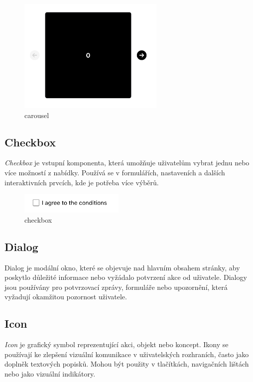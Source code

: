 \begin{figure}[H]
  \centering
  \includegraphics[width=7cm]{images/carousel}
  \captionsetup{justification=centering,margin=2cm}
  \caption{carousel} \label{picture:carousel}
\end{figure}

\subsection{Checkbox}
\emph{Checkbox} je vstupní komponenta, která umožňuje uživatelům vybrat jednu nebo více možností z nabídky. Používá se v formulářích, nastaveních a dalších interaktivních prvcích, kde je potřeba více výběrů.

\begin{figure}[H]
  \centering
  \includegraphics[width=5cm]{images/checkbox}
  \captionsetup{justification=centering,margin=2cm}
  \caption{checkbox} \label{picture:checkbox}
\end{figure}

\subsection{Dialog}
Dialog je modální okno, které se objevuje nad hlavním obsahem stránky, aby poskytlo důležité informace nebo vyžádalo potvrzení akce od uživatele. Dialogy jsou používány pro potvrzovací zprávy, formuláře nebo upozornění, která vyžadují okamžitou pozornost uživatele.

\subsection{Icon}
\emph{Icon} je grafický symbol reprezentující akci, objekt nebo koncept. Ikony se používají ke zlepšení vizuální komunikace v uživatelských rozhraních, často jako doplněk textových popisků. Mohou být použity v tlačítkách, navigačních lištách nebo jako vizuální indikátory.

